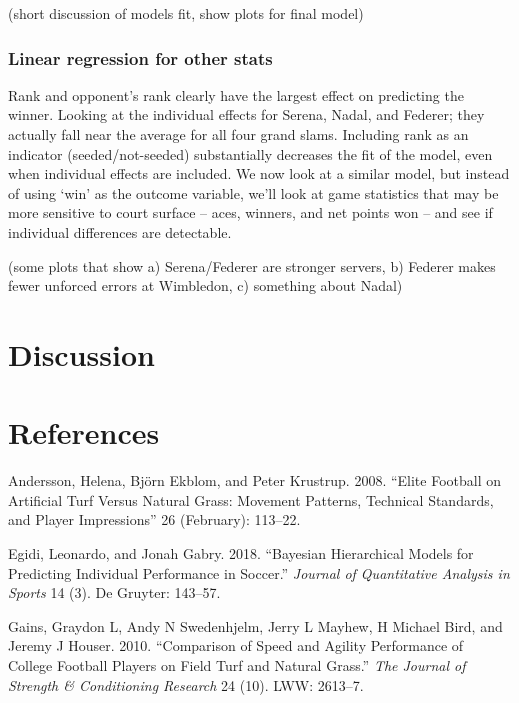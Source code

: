 \documentclass[]{article}
\begin{document}
(short discussion of models fit, show plots for final model)

\hypertarget{linear-regression-for-other-stats}{%
\subsubsection{Linear regression for other
stats}\label{linear-regression-for-other-stats}}

Rank and opponent's rank clearly have the largest effect on predicting
the winner. Looking at the individual effects for Serena, Nadal, and
Federer; they actually fall near the average for all four grand slams.
Including rank as an indicator (seeded/not-seeded) substantially
decreases the fit of the model, even when individual effects are
included. We now look at a similar model, but instead of using `win' as
the outcome variable, we'll look at game statistics that may be more
sensitive to court surface -- aces, winners, and net points won -- and
see if individual differences are detectable.

(some plots that show a) Serena/Federer are stronger servers, b) Federer
makes fewer unforced errors at Wimbledon, c) something about Nadal)

\hypertarget{sec:discussion}{%
\section{Discussion}\label{sec:discussion}}

\hypertarget{sec:refs}{%
\section{References}\label{sec:refs}}

\footnotesize

\hypertarget{refs}{}
\leavevmode\hypertarget{ref-andersson2008}{}%
Andersson, Helena, Björn Ekblom, and Peter Krustrup. 2008. ``Elite
Football on Artificial Turf Versus Natural Grass: Movement Patterns,
Technical Standards, and Player Impressions'' 26 (February): 113--22.

\leavevmode\hypertarget{ref-egidi2018}{}%
Egidi, Leonardo, and Jonah Gabry. 2018. ``Bayesian Hierarchical Models
for Predicting Individual Performance in Soccer.'' \emph{Journal of
Quantitative Analysis in Sports} 14 (3). De Gruyter: 143--57.

\leavevmode\hypertarget{ref-gains2010}{}%
Gains, Graydon L, Andy N Swedenhjelm, Jerry L Mayhew, H Michael Bird,
and Jeremy J Houser. 2010. ``Comparison of Speed and Agility Performance
of College Football Players on Field Turf and Natural Grass.'' \emph{The
Journal of Strength \& Conditioning Research} 24 (10). LWW: 2613--7.
\end{document}
